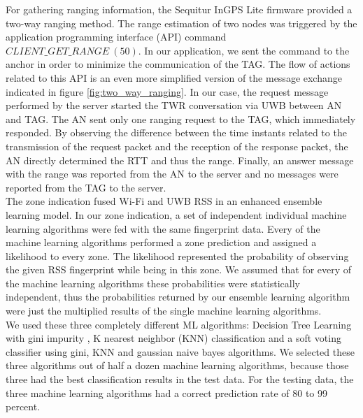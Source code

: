\noindent\hspace*{5mm}%
For gathering ranging information, the Sequitur InGPS Lite firmware provided a two-way ranging method. The range estimation of two nodes was triggered by the application programming interface (API) command $CLIENT\_GET\_RANGE\ (50)$. In our application, we sent the command to the anchor in order to minimize the communication of the TAG. The flow of actions related to this API is an even more simplified version of the message exchange indicated in figure \ref{fig:two_way_ranging}. In our case, the request message performed by the server started the TWR conversation via UWB between AN and TAG. The AN sent only one ranging request to the TAG, which immediately responded. By observing the difference between the time instants related to the transmission of the request packet and the reception of the response packet, the AN directly determined the RTT and thus the range. Finally, an answer message with the range was reported from the AN to the server and no messages were reported from the TAG to the server.\\
\noindent\hspace*{5mm}%
The zone indication fused Wi-Fi and UWB RSS in an enhanced ensemble learning model. In our zone indication, a set of independent individual machine learning algorithms were fed with the same fingerprint data. Every of the machine learning algorithms performed a zone prediction and assigned a likelihood to every zone. The likelihood represented the probability of observing the given RSS fingerprint while being in this zone. We assumed that for every of the machine learning algorithms these probabilities were statistically independent, thus the probabilities returned by our ensemble learning algorithm were just the multiplied results of the single machine learning algorithms.\\
We used these three completely different ML algorithms: Decision Tree Learning with gini impurity \cite{WikiGini}, K nearest neighbor (KNN) classification \cite{KNN} and a soft voting classifier using gini, KNN and gaussian naive bayes \cite{SKLearn, GaussianNB} algorithms. We selected these three algorithms out of half a dozen machine learning algorithms, because those three had the best classification results in the test data. For the testing data, the three machine learning algorithms had a correct prediction rate of 80 to 99 percent. 


